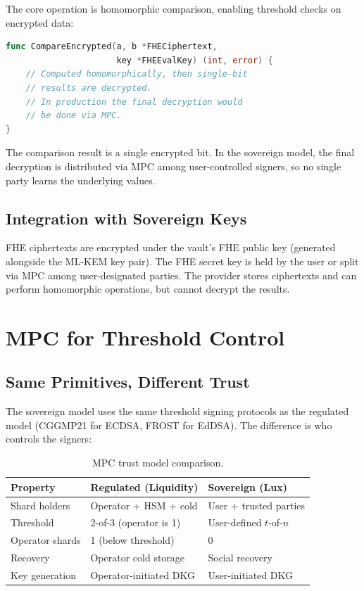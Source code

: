 \documentclass[11pt,a4paper]{article}
\begin{document}
The core operation is homomorphic comparison, enabling threshold checks
on encrypted data:

\begin{lstlisting}[language=Go,caption={fhe.go: encrypted comparison}]
func CompareEncrypted(a, b *FHECiphertext,
                      key *FHEEvalKey) (int, error) {
    // Computed homomorphically, then single-bit
    // results are decrypted.
    // In production the final decryption would
    // be done via MPC.
}
\end{lstlisting}

The comparison result is a single encrypted bit.  In the sovereign model,
the final decryption is distributed via MPC among user-controlled signers,
so no single party learns the underlying values.

\subsection{Integration with Sovereign Keys}

FHE ciphertexts are encrypted under the vault's FHE public key (generated
alongside the ML-KEM key pair).  The FHE secret key is held by the user
or split via MPC among user-designated parties.  The provider stores
ciphertexts and can perform homomorphic operations, but cannot decrypt
the results.

\section{MPC for Threshold Control}
\label{sec:mpc}

\subsection{Same Primitives, Different Trust}

The sovereign model uses the same threshold signing protocols as the
regulated model (CGGMP21 for ECDSA, FROST for EdDSA).  The difference
is who controls the signers:

\begin{table}[h]
\centering
\small
\begin{tabular}{@{}lll@{}}
\toprule
\textbf{Property} & \textbf{Regulated (Liquidity)} & \textbf{Sovereign (Lux)} \\
\midrule
Shard holders    & Operator + HSM + cold   & User + trusted parties \\
Threshold        & 2-of-3 (operator is 1)  & User-defined $t$-of-$n$ \\
Operator shards  & 1 (below threshold)     & 0 \\
Recovery         & Operator cold storage   & Social recovery \\
Key generation   & Operator-initiated DKG  & User-initiated DKG \\
\bottomrule
\end{tabular}
\caption{MPC trust model comparison.}
\label{tab:mpc-comparison}
\end{table}
\end{document}
